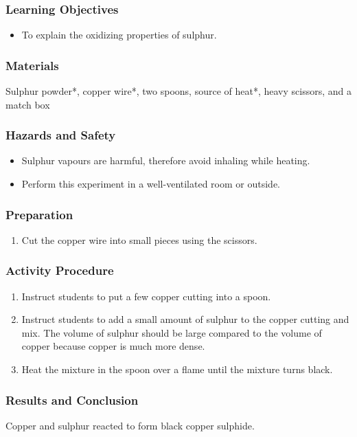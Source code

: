 \subsubsection*{Learning Objectives}
\begin{itemize}
\item{To explain the oxidizing properties of sulphur.}
\end{itemize}

\subsubsection*{Materials}
Sulphur powder*, copper wire*, two spoons, source of heat*, heavy scissors, and a match box

\subsubsection*{Hazards and Safety}
\begin{itemize}
\item{Sulphur vapours are harmful, therefore avoid inhaling while heating.}
\item{Perform this experiment in a well-ventilated room or outside.}
\end{itemize}

\subsubsection*{Preparation}
\begin{enumerate}
\item{Cut the copper wire into small pieces using the scissors.}
\end{enumerate}

\subsubsection*{Activity Procedure}
\begin{enumerate}
\item{Instruct students to put a few copper cutting into a spoon.}
\item{Instruct students to add a small amount of sulphur to the copper cutting and mix. The volume of sulphur should be large compared to the volume of copper because copper is much more dense.}
\item{Heat the mixture in the spoon over a flame until the mixture turns black.}
\end{enumerate}

\subsubsection*{Results and Conclusion}
Copper and sulphur reacted to form black copper sulphide.

